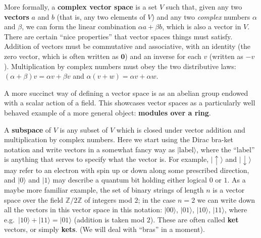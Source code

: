 \documentclass[fleqn]{article}
\newenvironment{technical}{\noindent}{\medskip}
\begin{document}
More formally, a \textbf{complex vector space} is a set \(V\) such that, given any two \textbf{vectors} \(a\) and \(b\) (that is, any two elements of \(V\)) and any two \emph{complex} numbers \(\alpha\) and \(\beta\), we can form the linear combination \(\alpha a+\beta b\), which is also a vector in \(V\).
There are certain ``nice properties'' that vector spaces things must satisfy. Addition of vectors must be commutative and associative, with an identity (the zero vector, which is often written as \(\mathbf{0}\)) and an inverse for each \(v\) (written as \(-v\)). Multiplication by complex numbers must obey the two distributive laws: \((\alpha+\beta)v = \alpha v+\beta v\) and \(\alpha (v+w) = \alpha v+\alpha w\).

\begin{technical}
A more succinct way of defining a vector space is as an abelian group endowed with a scalar action of a field.
This showcases vector spaces as a particularly well behaved example of a more general object: \textbf{modules over a ring}.

\end{technical}

A \textbf{subspace} of \(V\) is any subset of \(V\) which is closed under vector addition and multiplication by complex numbers.
Here we start using the Dirac bra-ket notation and write vectors in a somewhat fancy way as \(|\text{label}\rangle\), where the ``label'' is anything that serves to specify what the vector is.
For example, \(|\uparrow\rangle\) and \(|\downarrow\rangle\) may refer to an electron with spin up or down along some prescribed direction, and \(|0\rangle\) and \(|1\rangle\) may describe a quantum bit holding either logical \(0\) or \(1\).
As a maybe more familiar example, the set of binary strings of length \(n\) is a vector space over the field \(\mathbb{Z}/2\mathbb{Z}\) of integers mod \(2\); in the case \(n=2\) we can write down all the vectors in this vector space in this notation: \(|00\rangle\), \(|01\rangle\), \(|10\rangle\), \(|11\rangle\), where e.g.~\(|10\rangle+|11\rangle=|01\rangle\) (addition is taken mod \(2\)).
These are often called \textbf{ket} vectors, or simply \textbf{kets}.
(We will deal with ``bras'' in a moment).
\end{document}
